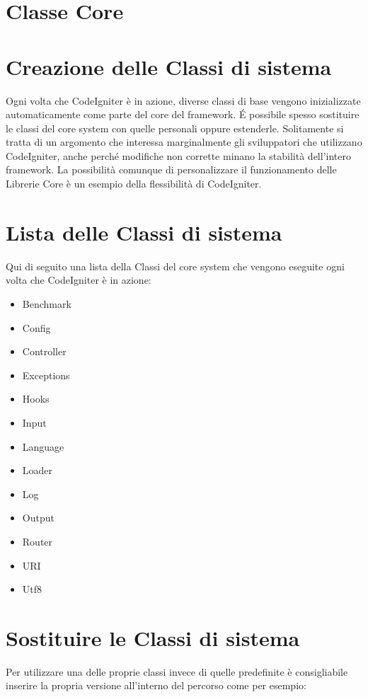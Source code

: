 \section{Classe Core}
\label{cap:classecore}

\section*{Creazione delle Classi di sistema}
Ogni volta che CodeIgniter è in azione, diverse classi di base vengono inizializzate automaticamente come parte del core del framework. \'E possibile spesso sostituire le classi del core system con quelle personali oppure estenderle. Solitamente si tratta di un argomento che interessa marginalmente gli sviluppatori che utilizzano CodeIgniter, anche perché modifiche non corrette minano la stabilità dell'intero framework. La possibilità comunque di personalizzare il funzionamento delle Librerie Core è un esempio della flessibilità di CodeIgniter.

\section*{Lista delle Classi di sistema}
Qui di seguito una lista della Classi del core system che vengono eseguite ogni volta che CodeIgniter è in azione:

\begin{itemize}
\item Benchmark
\item Config
\item Controller
\item Exceptions
\item Hooks
\item Input
\item Language
\item Loader
\item Log
\item Output
\item Router
\item URI
\item Utf8
\end{itemize}

\section*{Sostituire le Classi di sistema}
Per utilizzare una delle proprie classi invece di quelle predefinite è consigliabile inserire la propria versione all'interno del percorso  come per esempio:

